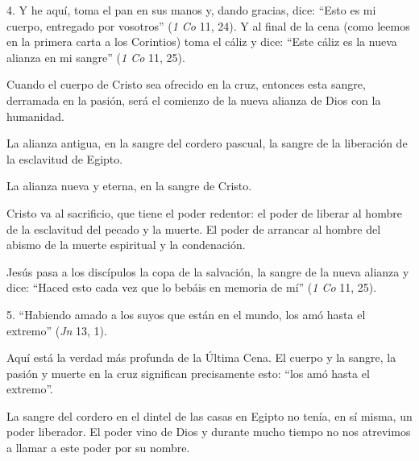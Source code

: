 			\begin{body}4. Y he aquí, toma el pan en sus manos y, dando gracias, dice: “Esto es mi cuerpo, entregado por vosotros” (\textit{1 Co} 11, 24). Y al final de la cena (como leemos en la primera carta a los Corintios) toma el cáliz y dice: “Este cáliz es la nueva alianza en mi sangre” (\textit{1 Co} 11, 25). \end{body}
			
			\begin{body}Cuando el cuerpo de Cristo sea ofrecido en la cruz, entonces esta sangre, derramada en la pasión, será el comienzo de la nueva alianza de Dios con la humanidad. \end{body}
			
			\begin{body}La alianza antigua, en la sangre del cordero pascual, la sangre de la liberación de la esclavitud de Egipto. \end{body}
			
			\begin{body}La alianza nueva y eterna, en la sangre de Cristo. \end{body}
			
			\begin{body}Cristo va al sacrificio, que tiene el poder redentor: el poder de liberar al hombre de la esclavitud del pecado y la muerte. El poder de arrancar al hombre del abismo de la muerte espiritual y la condenación. \end{body}
			
			\begin{body}Jesús pasa a los discípulos la copa de la salvación, la sangre de la nueva alianza y dice: “Haced esto cada vez que lo bebáis en memoria de mí” (\textit{1 Co} 11, 25). \end{body}
			
			\begin{body}5. “Habiendo amado a los suyos que están en el mundo, los amó hasta el extremo” (\textit{Jn} 13, 1). \end{body}
			
			\begin{body}Aquí está la verdad más profunda de la Última Cena. El cuerpo y la sangre, la pasión y muerte en la cruz significan precisamente esto: “los amó hasta el extremo”. \end{body}
			
			\begin{body}La sangre del cordero en el dintel de las casas en Egipto no tenía, en sí misma, un poder liberador. El poder vino de Dios y durante mucho tiempo no nos atrevimos a llamar a este poder por su nombre. \end{body}
			

